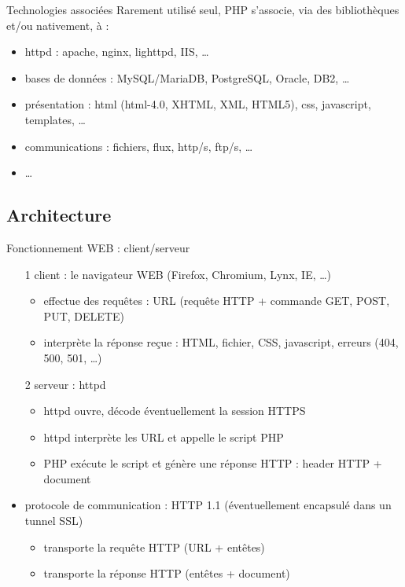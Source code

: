 \begin{frame}{Technologies associées}
	Rarement utilisé seul, PHP s’associe, via des bibliothèques et/ou nativement, à :
	\begin{itemize}
		\item httpd : apache, nginx, lighttpd, IIS, \ldots
		\item bases de données : MySQL/MariaDB, PostgreSQL, Oracle, DB2, \ldots
		\item présentation : html (html-4.0, XHTML, XML, HTML5), css, javascript, templates, \ldots
		\item communications : fichiers, flux, http/s, ftp/s, \ldots
		\item \ldots
	\end{itemize}
\end{frame}

\subsection{Architecture}

\begin{frame}{Fonctionnement WEB : client/serveur}
	\begin{itemize}
		\item[1] client : le navigateur WEB (Firefox, Chromium, Lynx, IE, \ldots)
			\begin{itemize}
				\item effectue des requêtes : URL (requête HTTP + commande GET, POST, PUT, DELETE)
				\item interprète la réponse reçue : HTML, fichier, CSS, javascript, erreurs (404, 500, 501, \ldots) 
			\end{itemize} 
		\item[2] serveur : httpd 
			\begin{itemize}
				\item httpd ouvre, décode éventuellement la session HTTPS
				\item httpd interprète les URL et appelle le script PHP
				\item PHP exécute le script et génère une réponse HTTP : header HTTP + document
			\end{itemize}
		\item protocole de communication : HTTP 1.1 (éventuellement encapsulé dans un tunnel SSL)
		 	\begin{itemize}
		 		\item transporte la requête HTTP (URL + entêtes)
		 		\item transporte la réponse HTTP (entêtes + document)
		 	\end{itemize}
	\end{itemize}
\end{frame}

